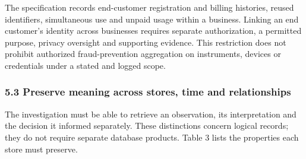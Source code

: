 \documentclass[
  11pt,
]{article}
\begin{document}
The specification records end-customer registration and billing
histories, reused identifiers, simultaneous use and unpaid usage within
a business. Linking an end customer's identity across businesses
requires separate authorization, a permitted purpose, privacy oversight
and supporting evidence. This restriction does not prohibit authorized
fraud-prevention aggregation on instruments, devices or credentials
under a stated and logged scope.

\hypertarget{preserve-meaning-across-stores-time-and-relationships}{%
\subsubsection{5.3 Preserve meaning across stores, time and
relationships}\label{preserve-meaning-across-stores-time-and-relationships}}

The investigation must be able to retrieve an observation, its
interpretation and the decision it informed separately. These
distinctions concern logical records; they do not require separate
database products. Table 3 lists the properties each store must
preserve.
\end{document}
